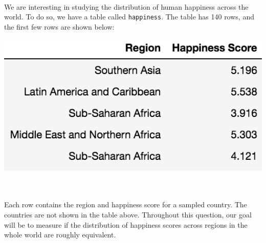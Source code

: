  \\ 

We are interesting in studying the distribution of human happiness across the world. To do so, we have a table called {\tt happiness}. The table has 140 rows, and the first few rows are shown below: 

\begin{center}
\includegraphics[scale=1]{countries.png}
\end{center}\\
\\ 
Each row contains the region and happiness score for a sampled country. The countries are not shown in the table above. Throughout this question, our goal will be to measure if the distribution of happiness scores across regions in the whole world are roughly equivalent. 

